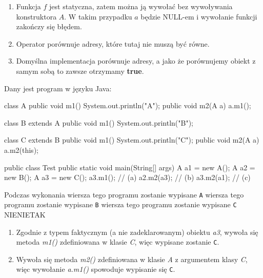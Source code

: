 \begin{solutions}
    \begin{enumerate}[\bf A.]
        \item Funkcja $f$ jest statyczna, zatem można ją wywołać bez wywoływania konstruktora $A$. W takim przypadku $a$ będzie {\ttfamily NULL}-em i wywołanie funkcji zakończy się błędem.

        \item Operator \javainline{==} porównuje adresy, które tutaj nie muszą być równe.

        \item Domyślna implementacja  porównuje adresy, a jako że porównujemy obiekt z samym sobą to zawsze otrzymamy \textbf{true}.
    \end{enumerate}

    \sol Dany jest program w języku Java:
    \begin{java}
        class A {
            public void m1() { System.out.println("A"); }
            public void m2(A a) { a.m1(); }
        }
        
        class B extends A {
            public void m1() { System.out.println("B"); }
        }
        
        class C extends B {
            public void m1() { System.out.println("C"); }
            public void m2(A a) { a.m2(this); }
        }
        
        public class Test {
            public static void main(String[] args) {
                A a1 = new A();
                A a2 = new B();
                A a3 = new C();
                a3.m1();   // (a)
                a2.m2(a3); // (b)
                a3.m2(a1); // (c)
            }
        }
    \end{java}
    Podczas wykonania
    \answerss
    {wiersza  tego programu zostanie wypisane \texttt{A}}
    {wiersza  tego programu zostanie wypisane \texttt{B}}
    {wiersza  tego programu zostanie wypisane \texttt{C}}
    {NIE}{NIE}{TAK}

    \begin{enumerate}[\bf A.]
        \item Zgodnie z typem faktycznym (a nie zadeklarowanym) obiektu \textit{a3}, wywoła się metoda \textit{m1()} zdefiniowana w klasie \textit{C}, więc wypisane zostanie \texttt{C}.
        
        \item Wywoła się metoda \textit{m2()} zdefiniowana w klasie \textit{A} z argumentem klasy \textit{C}, więc wywołanie \textit{a.m1()} spowoduje wypisanie się \texttt{C}.


\end{enumerate}
\end{solutions}
